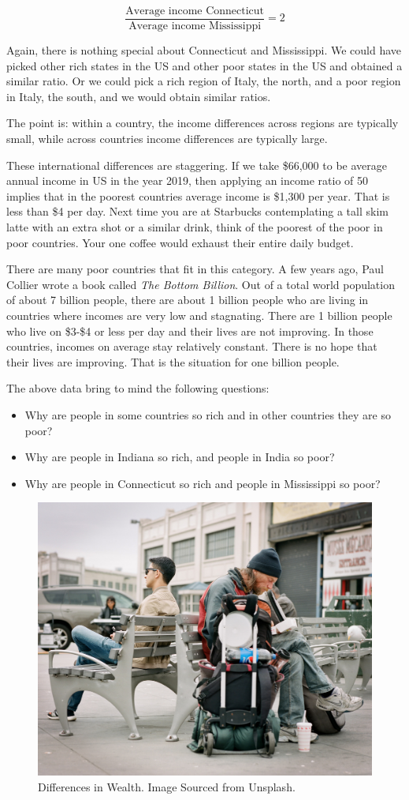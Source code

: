 \documentclass[
]{book}
\providecommand{\tightlist}{%
  \setlength{\itemsep}{0pt}\setlength{\parskip}{0pt}}
\begin{document}
\[\frac{\text{Average income Connecticut}}{\text{Average income Mississippi}}=2\]

Again, there is nothing special about Connecticut and Mississippi. We could have picked other rich states in the US and other poor states in the US and obtained a similar ratio. Or we could pick a rich region of Italy, the north, and a poor region in Italy, the south, and we would obtain similar ratios.

The point is: within a country, the income differences across regions are typically small, while across countries income differences are typically large.

These international differences are staggering. If we take \$66,000 to be average annual income in US in the year 2019, then applying an income ratio of 50 implies that in the poorest countries average income is \$1,300 per year. That is less than \$4 per day. Next time you are at Starbucks contemplating a tall skim latte with an extra shot or a similar drink, think of the poorest of the poor in poor countries. Your one coffee would exhaust their entire daily budget.

There are many poor countries that fit in this category. A few years ago, Paul Collier wrote a book called \emph{The Bottom Billion}. Out of a total world population of about 7 billion people, there are about 1 billion people who are living in countries where incomes are very low and stagnating. There are 1 billion people who live on \$3-\$4 or less per day and their lives are not improving. In those countries, incomes on average stay relatively constant. There is no hope that their lives are improving. That is the situation for one billion people.

The above data bring to mind the following questions:

\begin{itemize}
\tightlist
\item
  Why are people in some countries so rich and in other countries they are so poor?
\item
  Why are people in Indiana so rich, and people in India so poor?
\item
  Why are people in Connecticut so rich and people in Mississippi so poor?
\end{itemize}

\begin{figure}

{\centering \includegraphics[width=0.5\linewidth]{img/growth/fig1} 

}

\caption{Differences in Wealth. Image Sourced from Unsplash.}\label{fig:growth01}
\end{figure}
\end{document}

